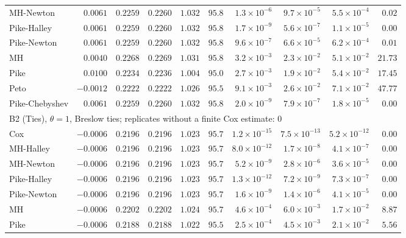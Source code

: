 \begin{landscape}
\begin{longtable}{lrrrrrrrrr}
MH-Newton & $0.0061$ & $0.2259$ & $0.2260$ & $1.032$ & $95.8$ & $1.3 \times 10^{-6}$ & $9.7 \times 10^{-5}$ & $5.5 \times 10^{-4}$ & $0.02$ \\
Pike-Halley & $0.0061$ & $0.2259$ & $0.2260$ & $1.032$ & $95.8$ & $1.7 \times 10^{-9}$ & $5.6 \times 10^{-7}$ & $1.1 \times 10^{-5}$ & $0.00$ \\
Pike-Newton & $0.0061$ & $0.2259$ & $0.2260$ & $1.032$ & $95.8$ & $9.6 \times 10^{-7}$ & $6.6 \times 10^{-5}$ & $6.2 \times 10^{-4}$ & $0.01$ \\
MH & $0.0040$ & $0.2268$ & $0.2269$ & $1.031$ & $95.8$ & $3.2 \times 10^{-3}$ & $2.3 \times 10^{-2}$ & $5.1 \times 10^{-2}$ & $21.73$ \\
Pike & $0.0100$ & $0.2234$ & $0.2236$ & $1.004$ & $95.0$ & $2.7 \times 10^{-3}$ & $1.9 \times 10^{-2}$ & $5.4 \times 10^{-2}$ & $17.45$ \\
Peto & $-0.0012$ & $0.2222$ & $0.2222$ & $1.026$ & $95.5$ & $9.1 \times 10^{-3}$ & $2.6 \times 10^{-2}$ & $7.1 \times 10^{-2}$ & $47.77$ \\
Pike-Chebyshev & $0.0061$ & $0.2259$ & $0.2260$ & $1.032$ & $95.8$ & $2.0 \times 10^{-9}$ & $7.9 \times 10^{-7}$ & $1.8 \times 10^{-5}$ & $0.00$ \\
\multicolumn{10}{l}{B2 (Ties), $\theta = 1$, Breslow ties; replicates without a finite Cox estimate: 0} \\
Cox & $-0.0006$ & $0.2196$ & $0.2196$ & $1.023$ & $95.7$ & $1.2 \times 10^{-15}$ & $7.5 \times 10^{-13}$ & $5.2 \times 10^{-12}$ & $0.00$ \\
MH-Halley & $-0.0006$ & $0.2196$ & $0.2196$ & $1.023$ & $95.7$ & $8.0 \times 10^{-12}$ & $1.7 \times 10^{-8}$ & $4.1 \times 10^{-7}$ & $0.00$ \\
MH-Newton & $-0.0006$ & $0.2196$ & $0.2196$ & $1.023$ & $95.7$ & $5.2 \times 10^{-9}$ & $2.8 \times 10^{-6}$ & $3.6 \times 10^{-5}$ & $0.00$ \\
Pike-Halley & $-0.0006$ & $0.2196$ & $0.2196$ & $1.023$ & $95.7$ & $1.3 \times 10^{-12}$ & $7.2 \times 10^{-9}$ & $7.3 \times 10^{-7}$ & $0.00$ \\
Pike-Newton & $-0.0006$ & $0.2196$ & $0.2196$ & $1.023$ & $95.7$ & $1.6 \times 10^{-9}$ & $1.4 \times 10^{-6}$ & $4.1 \times 10^{-5}$ & $0.00$ \\
MH & $-0.0006$ & $0.2202$ & $0.2202$ & $1.024$ & $95.7$ & $4.6 \times 10^{-4}$ & $6.0 \times 10^{-3}$ & $1.7 \times 10^{-2}$ & $8.87$ \\
Pike & $-0.0006$ & $0.2188$ & $0.2188$ & $1.022$ & $95.5$ & $2.5 \times 10^{-4}$ & $4.5 \times 10^{-3}$ & $2.1 \times 10^{-2}$ & $5.56$ \\

\end{longtable}
\end{landscape}
